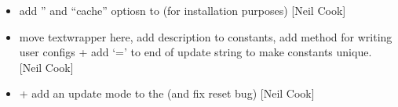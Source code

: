 \documentclass[a4paper,10pt,english]{report}
\begin{document}
\begin{itemize}
\item {} 
 \sphinxhyphen{} add ” and “cache”
optiosn to  (for installation purposes) {[}Neil Cook{]}

\item {} 
 \sphinxhyphen{} move textwrapper here, add
description to constants, add  method for writing user
configs + add ‘=’ to end of update string to make constants unique.
{[}Neil Cook{]}

\item {} 
 +  \sphinxhyphen{} add an update mode to the
 (and fix reset bug) {[}Neil Cook{]}

\end{itemize}
\end{document}
